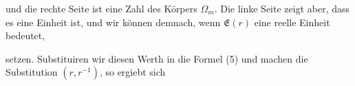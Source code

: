 und die rechte Seite ist eine Zahl des K\"orpers $\Omega_m$. Die
linke Seite zeigt aber, dass es eine Einheit ist, und wir k\"onnen
demnach, wenn $\mathfrak{E}(r)$ eine reelle Einheit bedeutet,


setzen. Substituiren wir diesen Werth in die Formel (5) und machen
die Substitution $(r, r^{-1})$, so ergiebt sich

